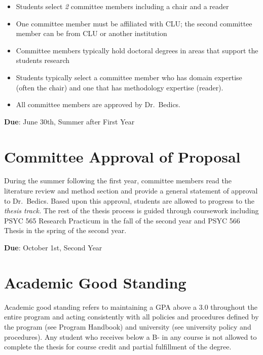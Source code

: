 \documentclass[openany]{book}
\providecommand{\tightlist}{%
  \setlength{\itemsep}{0pt}\setlength{\parskip}{0pt}}
\begin{document}
\begin{itemize}
\tightlist
\item
  Students select \emph{2} committee members including a chair and a reader
\item
  One committee member must be affiliated with CLU; the second committee member can be from CLU or another institution
\item
  Committee members typically hold doctoral degrees in areas that support the students research
\item
  Students typically select a committee member who has domain expertise (often the chair) and one that has methodology expertise (reader).\\
\item
  All committee members are approved by Dr.~Bedics.
\end{itemize}

\textbf{Due}: June 30th, Summer after First Year

\hypertarget{committee-approval-of-proposal}{%
\section{Committee Approval of Proposal}\label{committee-approval-of-proposal}}

During the summer following the first year, committee members read the literature review and method section and provide a general statement of approval to Dr.~Bedics. Based upon this approval, students are allowed to progress to the \emph{thesis track.} The rest of the thesis process is guided through coursework including PSYC 565 Research Practicum in the fall of the second year and PSYC 566 Thesis in the spring of the second year.

\textbf{Due}: October 1st, Second Year

\hypertarget{academic-good-standing}{%
\section{Academic Good Standing}\label{academic-good-standing}}

Academic good standing refers to maintaining a GPA above a 3.0 throughout the entire program and acting consistently with all policies and procedures defined by the program (see Program Handbook) and university (see university policy and procedures). Any student who receives below a B- in any course is not allowed to complete the thesis for course credit and partial fulfillment of the degree.
\end{document}
